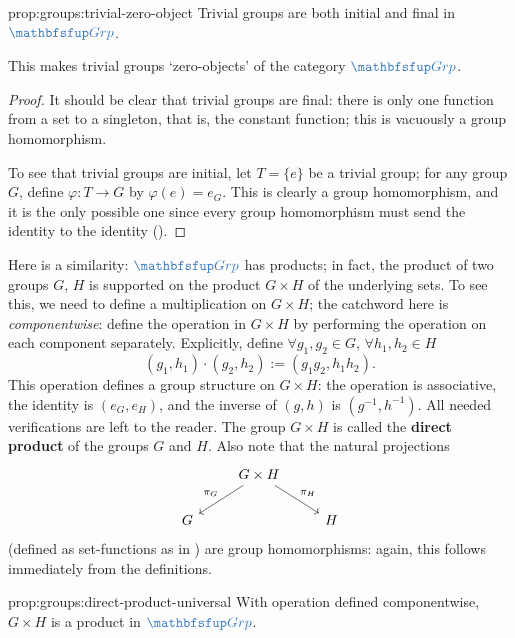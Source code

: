 \begin{prop}{}{prop:groups:trivial-zero-object}
    Trivial groups are both initial and final in
    $\categ{Grp}$.
\end{prop}

This makes trivial groups `zero-objects' of the category
$\categ{Grp}$.

\begin{proof}
  It should be clear that trivial groups are final: there is only one
  function from a set to a singleton, that is, the constant function;
  this is vacuously a group homomorphism.

  To see that trivial groups are initial, let $T = \{e\}$ be a trivial
  group; for any group $G$, define $\varphi : T \to G$ by
  $\varphi(e) = e_G$. This is clearly a group homomorphism, and it is
  the only possible one since every group homomorphism must send the
  identity to the identity
  ().
\end{proof}
Here is a similarity: $\categ{Grp}$ has products; in fact, the product
of two groups $G$, $H$ is supported on the product $G \times H$ of the
underlying sets. To see this, we need to define a multiplication on
$G \times H$; the catchword here is \textit{componentwise}: define the
operation in $G \times H$ by performing the operation on each
component separately. Explicitly, define $\forall g_1, g_2 \in G$,
$\forall h_1, h_2 \in H$
\[
  (g_1, h_1) \cdot (g_2, h_2) := (g_1 g_2, h_1 h_2).
\]
This operation defines a group structure on $G \times H$: the
operation is associative, the identity is $(e_G, e_H)$, and the
inverse of $(g, h)$ is $(g^{-1}, h^{-1})$. All needed verifications
are left to the reader. The group $G \times H$ is called the
\textbf{direct product} of the groups $G$ and $H$.  Also note that the
natural projections
\[
  \begin{tikzcd}
    & G \times H \arrow[dl, "\pi_G"'] \arrow[dr, "\pi_H"] & \\
    G & & H
  \end{tikzcd}
\]
(defined as set-functions as in
) are group
homomorphisms: again, this follows immediately from the definitions.
\begin{prop}{}{prop:groups:direct-product-universal}
  With operation defined componentwise, $G \times H$ is a product in
  $\categ{Grp}$.
\end{prop}
